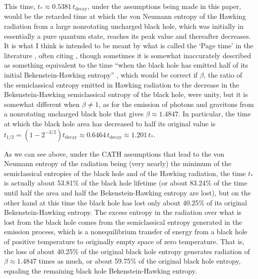 \documentclass[12pt]{article}
\begin{document}
This time, $t_\ast \approx 0.5381\, t_\mathrm{decay}$, under the assumptions being made in this paper, would be the retarded time at which the von Neumann entropy of the Hawking radiation from a large nonrotating uncharged black hole, which was initially in essentially a pure quantum state, reaches its peak value and thereafter decreases.  It is what I think is intended to be meant by what is called the `Page time' in the literature \cite{Czech:2011wy,AMPS,Bousso:2012as,Nomura:2012sw, Chowdhury:2012vd, Susskind:2012rm,Giveon:2012kp,Banks:2012nn,Susskind:2012uw,Nomura:2012cx, Avery:2012tf,Larjo:2012jt,Nomura:2012ex,Giddings:2012gc,Dvali:2012wq, Veneziano:2012yj}, often citing \cite{Page:1993df,Page:1993wv},
though sometimes \cite{AMPS,Bousso:2012as,Nomura:2012sw,Susskind:2012rm, Susskind:2012uw,Nomura:2012cx, Nomura:2012ex} it is somewhat inaccurately described as something equivalent to the time ``when the black hole has emitted half of its initial Bekenstein-Hawking entropy'' \cite{AMPS}, which would be correct if $\beta$, the ratio of the semiclassical entropy emitted in Hawking radiation to the decrease in the Bekenstein-Hawking semiclassical entropy of the black hole, were unity, but it is somewhat different when $\beta \neq 1$, as for the emission of photons and gravitons from a nonrotating uncharged black hole that gives $\beta \approx 1.4847$.  In particular, the time at which the black hole area has decreased to half its original value is $t_{1/2} = (1-2^{-3/2})t_\mathrm{decay} \approx 0.6464\, t_\mathrm{decay} \approx 1.201\, t_\ast$.

As we can see above, under the CATH assumptions that lead to the von Neumann entropy of the radiation being (very nearly) the minimum of the semiclassical entropies of the black hole and of the Hawking radiation, the time $t_\ast$ is actually about 53.81\% of the black hole lifetime (or about 83.24\% of the time until half the area and half the Bekenstein-Hawking entropy are lost), but on the other hand at this time the black hole has lost only about 40.25\% of its original Bekenstein-Hawking entropy.  The excess entropy in the radiation over what is lost from the black hole comes from the semiclassical entropy generated in the emission process, which is a nonequilibrium transfer of energy from a black hole of positive temperature to originally empty space of zero temperature.  That is, the loss of about 40.25\% of the original black hole entropy generates radiation of $\beta \approx 1.4847$ times as much, or about 59.75\% of the original black hole entropy, equaling the remaining black hole Bekenstein-Hawking entropy.
\end{document}

